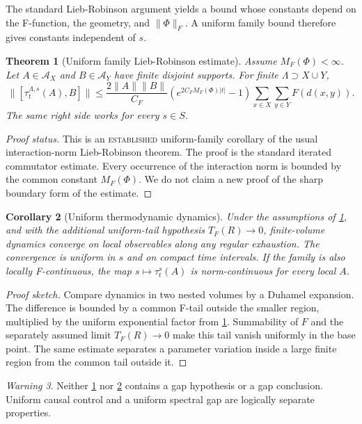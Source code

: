 \documentclass[12pt]{article}
\newtheorem{theorem}{Theorem}[section]
\newtheorem{corollary}[theorem]{Corollary}
\theoremstyle{definition}
\theoremstyle{remark}
\newtheorem{warning}[theorem]{Warning}
\newcommand{\A}{\mathcal A}
\newcommand{\status}[1]{\textsc{#1}}
\begin{document}
The standard Lieb-Robinson argument yields a bound whose constants depend on
the F-function, the geometry, and $\|\Phi\|_F$. A uniform family bound therefore
gives constants independent of $s$.

\begin{theorem}[Uniform family Lieb-Robinson estimate]
\label{thm:uniform-lr}
Assume $M_F(\Phi)<\infty$. Let $A\in\A_X$ and $B\in\A_Y$ have finite disjoint
supports. For finite $\Lambda\supset X\cup Y$,
\[
\|[\tau_t^{\Lambda,s}(A),B]\|
\leq
\frac{2\|A\|\|B\|}{C_F}
\left(e^{2C_FM_F(\Phi)|t|}-1\right)
\sum_{x\in X}\sum_{y\in Y}F(d(x,y)).
\]
The same right side works for every $s\in S$.
\end{theorem}

\begin{proof}[Proof status]
This is an \status{established} uniform-family corollary of the usual
interaction-norm Lieb-Robinson theorem. The proof is the standard iterated
commutator estimate. Every occurrence of the interaction norm is bounded by
the common constant $M_F(\Phi)$. We do not claim a new proof of the sharp
boundary form of the estimate.
\end{proof}

\begin{corollary}[Uniform thermodynamic dynamics]
\label{cor:thermo-dynamics}
Under the assumptions of \cref{thm:uniform-lr}, and with the additional
uniform-tail hypothesis $T_F(R)\to0$, finite-volume dynamics converge on local
observables along any regular exhaustion. The convergence is uniform in $s$
and on compact time intervals. If the family is also locally F-continuous, the
map $s\mapsto\tau_t^s(A)$ is norm-continuous for every local $A$.
\end{corollary}

\begin{proof}[Proof sketch]
Compare dynamics in two nested volumes by a Duhamel expansion. The difference
is bounded by a common F-tail outside the smaller region, multiplied by the
uniform exponential factor from \cref{thm:uniform-lr}. Summability of $F$
and the separately assumed limit $T_F(R)\to0$ make this tail vanish uniformly
in the base point. The same estimate separates a parameter variation
inside a large finite region from the common tail outside it.
\end{proof}

\begin{warning}
Neither \cref{thm:uniform-lr} nor \cref{cor:thermo-dynamics} contains a gap
hypothesis or a gap conclusion. Uniform causal control and a uniform spectral
gap are logically separate properties.
\end{warning}
\end{document}
